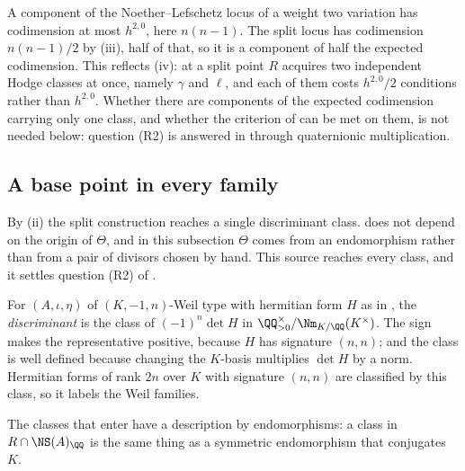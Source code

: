\begin{remark}
\label{rem:nlcodim}
A component of the Noether--Lefschetz locus of a weight two variation has
codimension at most $h^{2,0}$, here $n(n-1)$. The split locus has codimension
$n(n-1)/2$ by (iii), half of that, so it is a
component of half the expected codimension. This reflects
(iv): at a split point $R$ acquires two independent Hodge
classes at once, namely $\gamma$ and $\ell$, and each of them costs
$h^{2,0}/2$ conditions rather than $h^{2,0}$. Whether there are components
of the expected codimension carrying only one class, and whether the
criterion of  can be met on them, is not needed
below: question (R2) is answered in 
through quaternionic multiplication.
\end{remark}

\subsection{A base point in every family}\label{ssec:everyfamily}

By (ii) the split construction reaches a single
discriminant class.  does not depend on the origin of
$\Theta$, and in this subsection $\Theta$ comes from an endomorphism rather
than from a pair of divisors chosen by hand. This source reaches every class,
and it settles question (R2) of .

\begin{definition}[Discriminant]\label{def:disc}
For $(A,\iota,\eta)$ of $(K,-1,n)$-Weil type with hermitian form $H$ as in
, the \emph{discriminant} is the class of
$(-1)^{n}\det H$ in $\QQ^{\times}_{>0}/\Nm_{K/\QQ}(K^{\times})$. The sign
makes the representative positive, because $H$ has signature $(n,n)$; and the
class is well defined because changing the $K$-basis multiplies $\det H$ by a
norm. Hermitian forms of rank $2n$ over $K$ with signature $(n,n)$ are
classified by this class, so it labels the Weil families.
\end{definition}

The classes that enter  have a description by
endomorphisms: a class in $R\cap\NS(A)_{\QQ}$ is the same thing as a
symmetric endomorphism that conjugates $K$.

